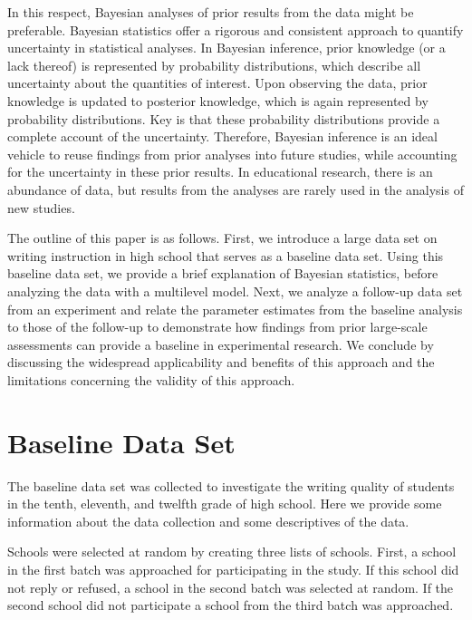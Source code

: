 \documentclass[man, mask]{apa7}
\begin{document}
In this respect, Bayesian analyses of prior results from the data might be preferable. Bayesian statistics offer a rigorous and consistent approach to quantify uncertainty in statistical analyses. In Bayesian inference, prior knowledge (or a lack thereof) is represented by probability distributions, which describe all uncertainty about the quantities of interest. Upon observing the data, prior knowledge is updated to posterior knowledge, which is again represented by probability distributions. Key is that these probability distributions provide a complete account of the uncertainty. Therefore, Bayesian inference is an ideal vehicle to reuse findings from prior analyses into future studies, while accounting for the uncertainty in these prior results. In educational research, there is an abundance of data, but results from the analyses are rarely used in the analysis of new studies.

The outline of this paper is as follows. 
First, we introduce a large data set on writing instruction in high school that serves as a baseline data set. 
Using this baseline data set, we provide a brief explanation of Bayesian statistics, before analyzing the data with a multilevel model. 
Next, we analyze a follow-up data set from an experiment and relate the parameter estimates from the baseline analysis to those of the follow-up to demonstrate how findings from prior large-scale assessments can provide a baseline in experimental research. 
We conclude by discussing the widespread applicability and benefits of this approach and the limitations concerning the validity of this approach.


\section*{Baseline Data Set}
\noindent The baseline data set was collected to investigate the writing quality of students in the tenth, eleventh, and twelfth grade of high school. Here we provide some information about the data collection and some descriptives of the data.

Schools were selected at random by creating three lists of schools. First, a school in the first batch was approached for participating in the study. If this school did not reply or refused, a school in the second batch was selected at random. If the second school did not participate a school from the third batch was approached.
\end{document}
